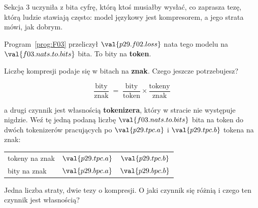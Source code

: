 \begin{fr}
Sekcja 3 uczyniła z bita cyfrę, którą ktoś musiałby wysłać, co zaprasza tezę,
którą ludzie stawiają często: model językowy jest kompresorem, a jego strata
mówi, jak dobrym.

Program~\ref{prog:F03} przeliczył $\val{p29.f02.loss}$ nata tego modelu na
$\val{f03.nats.to.bits}$ bita. To bity na \textbf{token}.

Liczbę kompresji podaje się w bitach na \textbf{znak}. Czego jeszcze
potrzebujesz?
\dotline
\nextframe
\end{fr}

\begin{fr}

\[ \frac{\text{bity}}{\text{znak}}
   \;=\; \frac{\text{bity}}{\text{token}}
   \times \frac{\text{tokeny}}{\text{znak}} \]

a drugi czynnik jest własnością \textbf{tokenizera}, który w stracie nie
występuje nigdzie. Weź tę jedną podaną liczbę
$\val{f03.nats.to.bits}$ bita na token do dwóch tokenizerów pracujących po
$\val{p29.tpc.a}$ i $\val{p29.tpc.b}$ tokena na znak:

\begin{center}
\begin{tabular}{lcc}
\toprule
tokeny na znak & $\val{p29.tpc.a}$ & $\val{p29.tpc.b}$ \\
bity na znak & $\val{p29.bpc.a}$ & $\val{p29.bpc.b}$ \\
\bottomrule
\end{tabular}
\end{center}

Jedna liczba straty, dwie tezy o kompresji. O jaki czynnik się różnią i czego
ten czynnik jest własnością?
\dotline
\nextframe
\end{fr}

